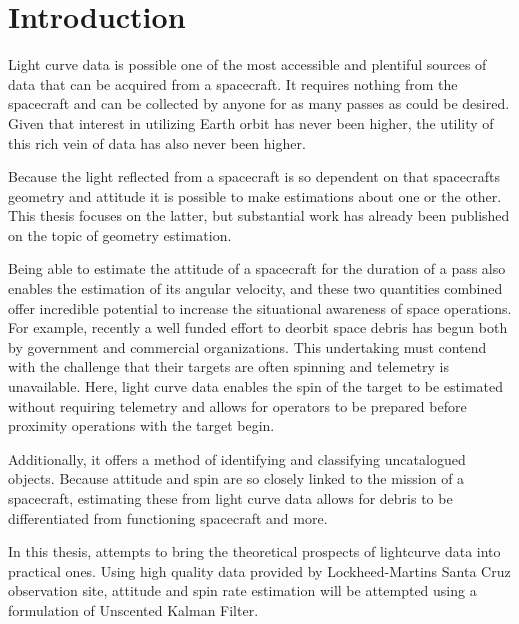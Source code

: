 \chapter*{Introduction}

Light curve data is possible one of the most accessible and plentiful sources of data that can be acquired from a spacecraft. It requires nothing from the spacecraft and can be collected by anyone for as many passes as could be desired. Given that interest in utilizing Earth orbit has never been higher, the utility of this rich vein of data has also never been higher.

Because the light reflected from a spacecraft is so dependent on that spacecrafts geometry and attitude it is possible to make estimations about one or the other. This thesis focuses on the latter, but substantial work has already been published on the topic of geometry estimation.

Being able to estimate the attitude of a spacecraft for the duration of a pass also enables the estimation of its angular velocity, and these two quantities combined offer incredible potential to increase the situational awareness of space operations. For example, recently a well funded effort to deorbit space debris has begun both by government and commercial organizations. This undertaking must contend with the challenge that their targets are often spinning and telemetry is unavailable. Here, light curve data enables the spin of the target to be estimated without requiring telemetry and allows for operators to be prepared before proximity operations with the target begin.

Additionally, it offers a method of identifying and classifying uncatalogued objects. Because attitude and spin are so closely linked to the mission of a spacecraft, estimating these from light curve data allows for debris to be differentiated from functioning spacecraft and more.

In this thesis, attempts to bring the theoretical prospects of lightcurve data into practical ones. Using high quality data provided by Lockheed-Martins Santa Cruz observation site, attitude and spin rate estimation will be attempted using a formulation of Unscented Kalman Filter.